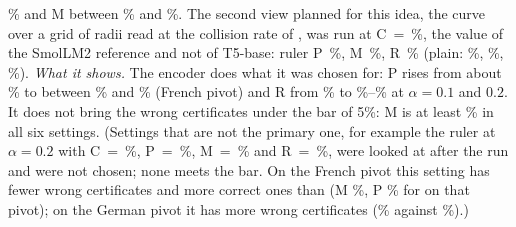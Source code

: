 \WidenFieldPHigh{}\% and \textsf{M} between \WidenFieldMLow{}\% and \WidenFieldMHigh{}\%. The second view planned for this idea, the curve over a grid of radii read at the collision rate of \cert{}, was run at
\textsf{C}~=~\WidenEncCurveC{}\%, the value of the SmolLM2 reference and not of T5-base: ruler \textsf{P}~\WidenEncCurveRulerP{}\%, \textsf{M}~\WidenEncCurveRulerM{}\%, \textsf{R}~\WidenEncCurveRulerR{}\%
(plain: \WidenEncCurvePlainP{}\%, \WidenEncCurvePlainM{}\%, \WidenEncCurvePlainR{}\%). \emph{What it shows.}
The encoder does what it was chosen for: \textsf{P} rises from about \WidenRefTfiveFrP{}\% to between
\WidenEncRulerTwentyFrP{}\% and \WidenEncPlainTenFrP{}\% (French pivot) and \textsf{R} from \WidenRefTfiveFrR{}\% to
\WidenEncRHighLow{}\%--\WidenEncRHighHigh{}\% at $\alpha = 0.1$ and $0.2$. It does not bring the wrong certificates under the bar of 5\%: \textsf{M} is at least \WidenEncRulerTwentyFrM{}\% in all six settings. (Settings that are not the primary one,
for example the ruler at $\alpha = 0.2$ with \textsf{C}~=~\WidenEncRulerTwentyFrC{}\%, \textsf{P}~=~\WidenEncRulerTwentyFrP{}\%,
\textsf{M}~=~\WidenEncRulerTwentyFrM{}\% and \textsf{R}~=~\WidenEncRulerTwentyFrR{}\%, were looked at after the run and were not chosen; none meets the bar. On the French
pivot this setting has fewer wrong certificates and more correct ones than \cert{} (\textsf{M} \WidenRefTfiveFrM{}\%, \textsf{P} \WidenRefTfiveFrP{}\%
for \cert{} on that pivot); on the German pivot it has more wrong certificates (\WidenEncRulerTwentyDeM{}\% against \WidenRefTfiveDeM{}\%).)

\begin{table}[t]
  \caption{The six settings of the sentence encoder (plain metric or paraphrase ruler; $\alpha = 0.05$,
  $0.1$, $0.2$), on the French and the German pivot, \WidenParaInputsPivot{} paraphrased inputs each,
  \WidenTasksEval{} evaluation tasks, in \%. The primary setting is in bold. \textsf{C} and \textsf{U} do not depend
  on the pivot. \textsf{Z} is to be compared with $1 - \alpha$. The radius was set on German-pivot paraphrases
  of other tasks.}
  \label{tab:widenencoder}
  \centering
  \footnotesize
  \setlength{\tabcolsep}{4pt}
  
\end{table}

